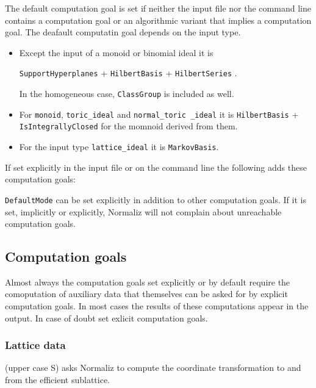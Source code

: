 The default computation goal is set if neither the input file nor the command line contains a computation goal or an algorithmic variant that implies a computation goal. The deafault computatin goal depends on the input type.
\begin{itemize}
	\item Except the input of a monoid or binomial ideal it is
	\begin{center}
		\verb|SupportHyperplanes| + \verb|HilbertBasis| + \verb|HilbertSeries| .
	\end{center}
	In the homogeneous case, \verb|ClassGroup| is included as well.
	
	\item For \verb|monoid|, \verb|toric_ideal| and \verb|normal_toric _ideal| it is \verb|HilbertBasis| + \verb|IsIntegrallyClosed| for the momnoid derived from them.
	
	\item  For the input type \verb|lattice_ideal| it is  \verb|MarkovBasis|.
\end{itemize}

If set explicitly in the input file or on the command line the following adds these computation goals:
\begin{itemize}
	\itemtt[DefaultMode]
\end{itemize}

\verb|DefaultMode| can be set explicitly in addition to other computation goals. If it is set, implicitly or explicitly, Normaliz will not complain about unreachable computation goals.

\subsection{Computation goals}\label{goals}

Almost always the computation goals set explicitly or by default require the comoputation of auxiliary data that themselves can be asked for by explicit computation goals. In most cases the results of these computations appear in the output. In case of doubt set exlicit computation goals.

\subsubsection{Lattice data}

\begin{itemize}
	\itemtt[Sublattice, -S] (upper case S) asks Normaliz to compute the coordinate transformation to and from the efficient sublattice.
\end{itemize}

